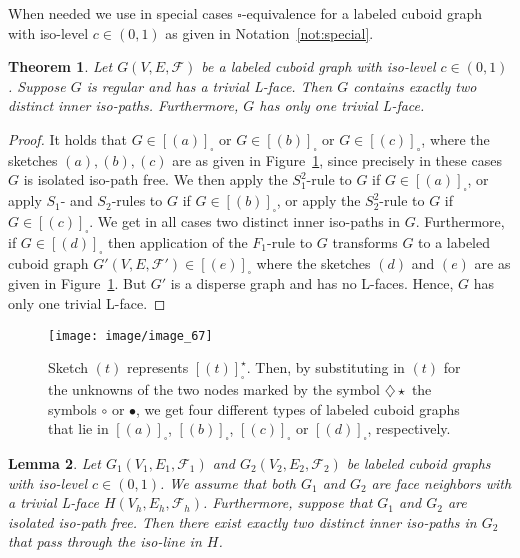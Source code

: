 \documentclass[a4paper,11pt]{article}
\newtheorem{theorem}{Theorem}[section]
\newtheorem{lemma}[theorem]{Lemma}
\begin{document}
When needed we use in special cases $\square$-equivalence for a labeled cuboid graph
with iso-level $c\in (0,1)$ as given in Notation~\ref{not:special}.

\begin{theorem}\label{thm:connect-1}
Let $G(V,E,\mathcal{F})$ be a labeled cuboid graph with iso-level $c\in (0,1)$. Suppose $G$ is regular
and has a trivial L-face. Then $G$ contains exactly two distinct inner iso-paths. Furthermore, $G$ has
only one trivial L-face.
\end{theorem}
\begin{proof} It holds that $G\in [(a)]_{\square}$ or $G\in [(b)]_{\square}$ or $G\in [(c)]_{\circ}$,
where the sketches $(a),(b),(c)$ are as given in Figure~\ref{image_67}, since precisely in these cases
$G$ is isolated iso-path free. We then apply the $S_1^2$-rule to $G$ if $G\in [(a)]_{\square}$,
or apply $S_1$- and $S_2$-rules to $G$ if $G\in [(b)]_{\square}$, or apply the $S_2^2$-rule to $G$ if
$G\in [(c)]_{\square}$. We get in all cases two distinct inner iso-paths in $G$. Furthermore, if
$G\in [(d)]_{\square}$ then application of the $F_1$-rule to $G$ transforms $G$ to a labeled cuboid
graph $G'(V,E,\mathcal{F}')\in [(e)]_{\square}$ where the sketches $(d)$ and $(e)$ are as given in
Figure~\ref{image_67}. But $G'$ is a disperse graph and has no L-faces. Hence, $G$ has only one trivial
L-face.
\end{proof}
\begin{figure}[!ht]
\texttt{[image: image/image\_67]}
\caption{Sketch $(t)$ represents $[(t)]_{\square}^{\star}$. Then, by substituting in $(t)$ for the
unknowns of the two nodes marked by the symbol $\diamondsuit\!\!\!\!\star$ the symbols
$\circ$ or $\bullet$, we get four different types of labeled cuboid graphs that lie in
$[(a)]_{\square}$, $[(b)]_{\square}$, $[(c)]_{\square}$ or $[(d)]_{\square}$, respectively.}
\label{image_67}
\end{figure}
\FloatBarrier
\begin{lemma}\label{lemma:connect-1}
Let $G_1(V_1,E_1,\mathcal{F}_1)$ and $G_2(V_2,E_2,\mathcal{F}_2)$ be labeled cuboid graphs with
iso-level $c\in (0,1)$. We assume that both $G_1$ and $G_2$ are face neighbors with a trivial
L-face $H(V_h,E_h,\mathcal{F}_h)$. Furthermore, suppose that $G_1$ and $G_2$ are isolated iso-path
free. Then there exist exactly two distinct inner iso-paths in $G_2$ that pass through the iso-line
in $H$.
\end{lemma}
\end{document}
